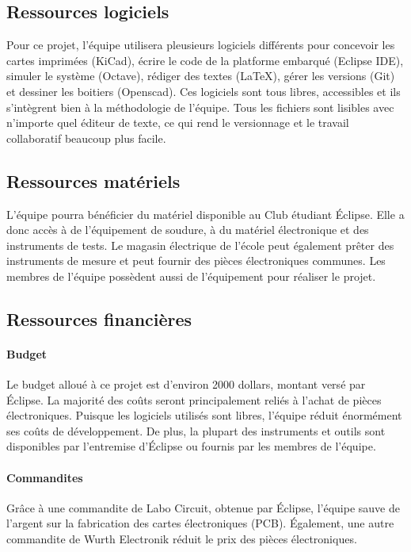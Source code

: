 	\subsection{Ressources logiciels}
	Pour ce projet, l'équipe utilisera pleusieurs logiciels différents pour concevoir les cartes imprimées (KiCad), écrire le code de la platforme embarqué (Eclipse IDE), simuler le système (Octave), rédiger des textes (LaTeX), gérer les versions (Git) et dessiner les boitiers (Openscad). Ces logiciels sont tous libres, accessibles et ils s'intègrent bien à la méthodologie de l'équipe. Tous les fichiers sont lisibles avec n'importe quel éditeur de texte, ce qui rend le versionnage et le travail collaboratif beaucoup plus facile.\\

	
	\subsection{Ressources matériels}
	L'équipe pourra bénéficier du matériel disponible au Club étudiant Éclipse. Elle a donc accès à de l'équipement de soudure, à du matériel électronique et des instruments de tests. Le magasin électrique de l'école peut également prêter des instruments de mesure et peut fournir des pièces électroniques communes. Les membres de l'équipe possèdent aussi de l'équipement pour réaliser le projet.


	\subsection{Ressources financières}

		\paragraph{Budget}
		Le budget alloué à ce projet est d'environ 2000 dollars, montant versé par Éclipse. La majorité des coûts seront principalement reliés à l'achat de pièces électroniques. Puisque les logiciels utilisés sont libres, l'équipe réduit énormément ses coûts de développement. De plus, la plupart des instruments et outils sont disponibles par l'entremise d'Éclipse ou fournis par les membres de l'équipe.
		
		\paragraph{Commandites}
 		Grâce à une commandite de Labo Circuit, obtenue par Éclipse, l'équipe sauve de l'argent sur la fabrication des cartes électroniques (PCB). Également, une autre commandite de Wurth Electronik réduit le prix des pièces électroniques.